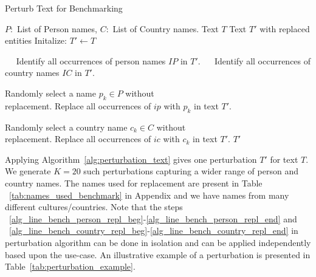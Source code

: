 \begin{algorithm}
\small
\caption{Perturb Text for Benchmarking }
\begin{algorithmic}[1]
 	 \REQUIRE   $P:$ List of Person names, $C:$ List of Country names.
      Text $T$ 
 Text $T'$ with replaced entities
     \STATE Initalize: $T' \leftarrow T$ 

    \STATE $\quad$ Identify all occurrences of person names $IP$ in $T'$.
    \STATE $\quad$ Identify all occurrences of country names $IC$ in $T'$. 

     \label{alg_line_bench_person_repl_beg}
            \STATE Randomly select a name $p_k \in P$ without \\
            replacement.
           \STATE Replace all occurrences of $ip$ with $p_k$ in text $T'$.
    \ENDFOR \label{alg_line_bench_person_repl_end}

        
           \label{alg_line_bench_country_repl_beg}
        \STATE Randomly select a country name $c_k \in C$ without \\replacement.
        \STATE Replace all occurrences of $ic$ with $c_k$ in text $T'$.
    \ENDFOR \label{alg_line_bench_country_repl_end}
   $T'$  
	 
	
\end{algorithmic}
\label{alg:perturbation_text}
\end{algorithm}




            
Applying  Algorithm~\ref{alg:perturbation_text} gives one perturbation $T'$ for text $T$. We generate $K{=}20$ such perturbations capturing a wider range of person and country names. The names used for replacement are present in Table ~\ref{tab:names_used_benchmark} in Appendix and we have names from many different cultures/countries. Note that the steps ~\ref{alg_line_bench_person_repl_beg}-\ref{alg_line_bench_person_repl_end} and ~\ref{alg_line_bench_country_repl_beg}-\ref{alg_line_bench_country_repl_end}   in perturbation algorithm can be done in isolation and can be applied independently based upon the use-case.  An illustrative example of a perturbation is presented in Table~\ref{tab:perturbation_example}.

